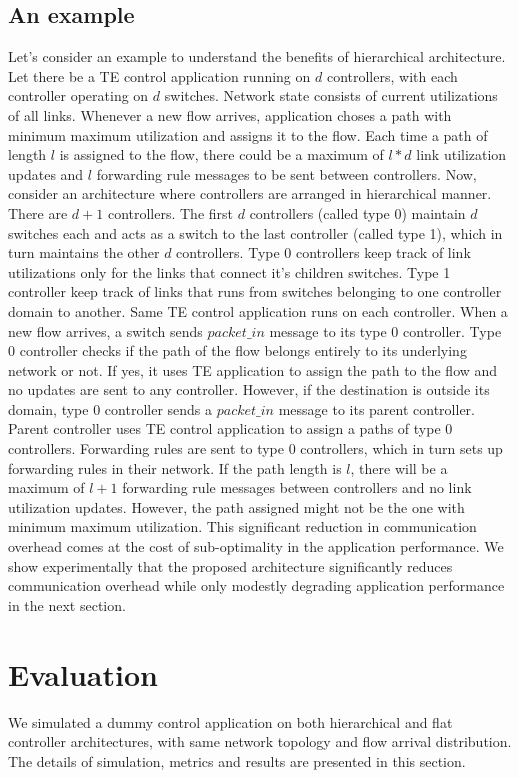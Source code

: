 \documentclass[10pt, twocolumn]{article}
\begin{document}
\subsection{An example}
\label{example}
Let's consider an example to understand the benefits of hierarchical architecture. Let there be a TE control application running on $d$ controllers, with each controller operating on $d$ switches. Network state consists of current utilizations of all links. Whenever a new flow arrives, application choses a path with minimum maximum utilization and assigns it to the flow. Each time a path of length $l$ is assigned to the flow, there could be a maximum of $l*d$ link utilization updates and $l$ forwarding rule messages to be sent between controllers. Now, consider an architecture where controllers are arranged in hierarchical manner. There are $d+1$ controllers. The first $d$ controllers (called type 0) maintain $d$ switches each and acts as a switch to the last controller (called type 1), which in turn maintains the other $d$ controllers. Type 0 controllers keep track of link utilizations only for the links that connect it's children switches. Type 1 controller keep track of links that runs from switches belonging to one controller domain to another. Same TE control application runs on each controller. When a new flow arrives, a switch sends $packet\_in$ message to its type 0 controller. Type 0 controller checks if the path of the flow belongs entirely to its underlying network or not. If yes, it uses TE application to assign the path to the flow and no updates are sent to any controller. However, if the destination is outside its domain, type 0 controller sends a $packet\_in$ message to its parent controller. Parent controller uses TE control application to assign a paths of type 0 controllers. Forwarding rules are sent to type 0 controllers, which in turn sets up forwarding rules in their network. If the path length is $l$, there will be a maximum of $l+1$ forwarding rule messages between controllers and no link utilization updates. However, the path assigned might not be the one with minimum maximum utilization. This significant reduction in communication overhead comes at the cost of sub-optimality in the application performance. We show experimentally that the proposed architecture significantly reduces communication overhead while only modestly degrading application performance in the next section.

\section{Evaluation}
\label{sec:eval}
We simulated a dummy control application on both hierarchical and flat controller architectures, with same network topology and flow arrival distribution. The details of simulation, metrics and results are presented in this section.
\end{document}
